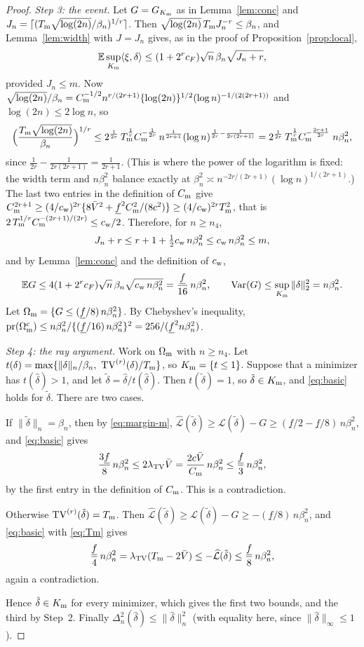 \documentclass[11pt]{article}
\theoremstyle{definition}
\theoremstyle{remark}
\newcommand{\E}{\mathbb{E}}
\newcommand{\pr}{\mathrm{pr}}
\newcommand{\TV}{\mathrm{TV}}
\newcommand{\lamtv}{\lambda_{\TV}}
\newcommand{\Lh}{\widehat{\mathcal L}}
\newcommand{\Lm}{\mathcal L}
\newcommand{\fl}{\underline f}
\newcommand{\Vb}{\bar V}
\newcommand{\nn}[1]{\|#1\|_n}
\begin{document}
\begin{proof}
\emph{Step 3: the event.} Let $G=G_{K_{\rm m}}$ as in Lemma~\ref{lem:conc} and $J_n=\lceil(T_{\rm m}\sqrt{\log(2n)}/\beta_n)^{1/r}\rceil$. Then $\sqrt{\log(2n)}\,T_{\rm m}J_n^{-r}\le\beta_n$, and Lemma~\ref{lem:width} with $J=J_n$ gives, as in the proof of Proposition~\ref{prop:local},
\[
\E\sup_{K_{\rm m}}\langle\xi,\delta\rangle\le(1+2^rc_F)\sqrt n\,\beta_n\sqrt{J_n+r},
\]
provided $J_n\le m$. Now $\sqrt{\log(2n)}/\beta_n=C_{\rm m}^{-1/2}n^{r/(2r+1)}\{\log(2n)\}^{1/2}(\log n)^{-1/(2(2r+1))}$ and $\log(2n)\le2\log n$, so
\[
\Bigl(\frac{T_{\rm m}\sqrt{\log(2n)}}{\beta_n}\Bigr)^{1/r}\le2^{\frac1{2r}}\,T_{\rm m}^{\frac1r}C_{\rm m}^{-\frac1{2r}}\,n^{\frac1{2r+1}}(\log n)^{\frac1{2r}-\frac1{2r(2r+1)}}
=2^{\frac1{2r}}\,T_{\rm m}^{\frac1r}C_{\rm m}^{-\frac{2r+1}{2r}}\;n\beta_n^2 ,
\]
since $\frac1{2r}-\frac1{2r(2r+1)}=\frac1{2r+1}$. (This is where the power of the logarithm is fixed: the width term and $n\beta_n^2$ balance exactly at $\beta_n^2\asymp n^{-2r/(2r+1)}(\log n)^{1/(2r+1)}$.) The last two entries in the definition of $C_{\rm m}$ give $C_{\rm m}^{2r+1}\ge(4/c_{\rm w})^{2r}\{8\Vb^2+\fl^2C_{\rm m}^2/(8c^2)\}\ge(4/c_{\rm w})^{2r}T_{\rm m}^2$, that is $2\,T_{\rm m}^{1/r}C_{\rm m}^{-(2r+1)/(2r)}\le c_{\rm w}/2$. Therefore, for $n\ge n_4$,
\[
J_n+r\le r+1+\tfrac12c_{\rm w}\,n\beta_n^2\le c_{\rm w}\,n\beta_n^2\le m,
\]
and by Lemma~\ref{lem:conc} and the definition of $c_{\rm w}$,
\[
\E G\le4(1+2^rc_F)\sqrt n\,\beta_n\sqrt{c_{\rm w}\,n\beta_n^2}=\frac{\fl}{16}\,n\beta_n^2,\qquad \mathrm{Var}(G)\le\sup_{K_{\rm m}}\|\delta\|_2^2=n\beta_n^2 .
\]
Let $\Omega_{\rm m}=\{G\le(\fl/8)\,n\beta_n^2\}$. By Chebyshev's inequality, $\pr(\Omega_{\rm m}^c)\le n\beta_n^2/\{(\fl/16)\,n\beta_n^2\}^2=256/(\fl^2n\beta_n^2)$.

\emph{Step 4: the ray argument.} Work on $\Omega_{\rm m}$ with $n\ge n_4$. Let $t(\delta)=\max\{\nn{\delta}/\beta_n,\ \TV^{(r)}(\delta)/T_{\rm m}\}$, so $K_{\rm m}=\{t\le1\}$. Suppose that a minimizer has $t(\hat\delta)>1$, and let $\tilde\delta=\hat\delta/t(\hat\delta)$. Then $t(\tilde\delta)=1$, so $\tilde\delta\in K_{\rm m}$, and \eqref{eq:basic} holds for $\tilde\delta$. There are two cases.

If $\nn{\tilde\delta}=\beta_n$, then by \eqref{eq:margin-m}, $\Lh(\tilde\delta)\ge\Lm(\tilde\delta)-G\ge(\fl/2-\fl/8)\,n\beta_n^2$, and \eqref{eq:basic} gives
\[
\frac{3\fl}{8}\,n\beta_n^2\le2\lamtv\Vb=\frac{2c\Vb}{C_{\rm m}}\,n\beta_n^2\le\frac{\fl}{3}\,n\beta_n^2,
\]
by the first entry in the definition of $C_{\rm m}$. This is a contradiction.

Otherwise $\TV^{(r)}(\tilde\delta)=T_{\rm m}$. Then $\Lh(\tilde\delta)\ge\Lm(\tilde\delta)-G\ge-(\fl/8)\,n\beta_n^2$, and \eqref{eq:basic} with \eqref{eq:Tm} gives
\[
\frac{\fl}{4}\,n\beta_n^2=\lamtv(T_{\rm m}-2\Vb)\le-\Lh(\tilde\delta)\le\frac{\fl}{8}\,n\beta_n^2,
\]
again a contradiction.

Hence $\hat\delta\in K_{\rm m}$ for every minimizer, which gives the first two bounds, and the third by Step~2. Finally $\Delta_n^2(\hat\delta)\le\nn{\hat\delta}^2$ (with equality here, since $\|\hat\delta\|_\infty\le1$).
\end{proof}
\end{document}
